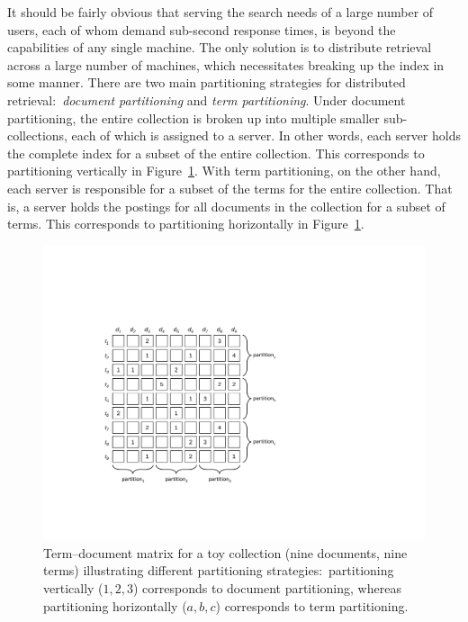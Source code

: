 It should be fairly obvious that serving the search needs of a large
number of users, each of whom demand sub-second response times, is
beyond the capabilities of any single machine.  The only solution is
to distribute retrieval across a large number of machines, which
necessitates breaking up the index in some manner.  There are two main
partitioning strategies for distributed retrieval:\ \emph{document
  partitioning} and \emph{term partitioning}.  Under document
partitioning, the entire collection is broken up into multiple smaller
sub-collections, each of which is assigned to a server.  In other
words, each server holds the complete index for a subset of the entire
collection.  This corresponds to partitioning vertically in
Figure~\ref{chapter-indexing:partition}.  With term partitioning, on
the other hand, each server is responsible for a subset of the terms
for the entire collection.  That is, a server holds the postings for
all documents in the collection for a subset of terms.  This
corresponds to partitioning horizontally in
Figure~\ref{chapter-indexing:partition}.

\begin{figure}[t]
\begin{center}
\vspace{0.2cm}
\includegraphics[scale=0.75]{figures/fig-ch4-indexing-partition.pdf}
\vspace{-0.3cm}
\end{center}
\caption{Term--document matrix for a toy collection (nine documents,
  nine terms) illustrating different partitioning
  strategies:\ partitioning vertically ($1,2,3$) corresponds to
  document partitioning, whereas partitioning horizontally ($a,b,c$)
  corresponds to term partitioning.}
\label{chapter-indexing:partition}
\end{figure}

